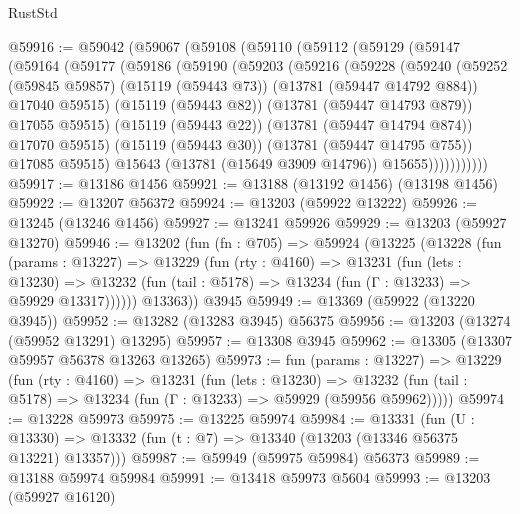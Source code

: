\begin{lexlean}{RustStd}
\begin{coremodule}
@59916 := @59042
    (@59067
      (@59108
        (@59110
          (@59112
            (@59129
              (@59147
                (@59164
                  (@59177
                    (@59186
                      (@59190
                        (@59203
                          (@59216
                            (@59228
                              (@59240
                                (@59252
                                  (@59845 @59857)
                                  (@15119 (@59443 @73))
                                  (@13781 (@59447 @14792 @884))
                                  @17040
                                  @59515)
                                (@15119 (@59443 @82))
                                (@13781 (@59447 @14793 @879))
                                @17055
                                @59515)
                              (@15119 (@59443 @22))
                              (@13781 (@59447 @14794 @874))
                              @17070
                              @59515)
                            (@15119 (@59443 @30))
                            (@13781 (@59447 @14795 @755))
                            @17085
                            @59515)
                          @15643
                          (@13781 (@15649 @3909 @14796))
                          @15655)))))))))))
@59917 := @13186 @1456
@59921 := @13188 (@13192 @1456) (@13198 @1456)
@59922 := @13207 @56372
@59924 := @13203 (@59922 @13222)
@59926 := @13245 (@13246 @1456)
@59927 := @13241 @59926
@59929 := @13203 (@59927 @13270)
@59946 := @13202
    (fun (fn : @705) =>
    @59924
      (@13225
        (@13228
          (fun (params : @13227) =>
          @13229
            (fun (rty : @4160) =>
            @13231
              (fun (lets : @13230) =>
              @13232 (fun (tail : @5178) => @13234 (fun (Γ : @13233) => @59929 @13317))))))
        @13363))
    @3945
@59949 := @13369 (@59922 (@13220 @3945))
@59952 := @13282 (@13283 @3945) @56375
@59956 := @13203 (@13274 (@59952 @13291) @13295)
@59957 := @13308 @3945
@59962 := @13305 (@13307 @59957 @56378 @13263 @13265)
@59973 := fun (params : @13227) =>
  @13229
    (fun (rty : @4160) =>
    @13231
      (fun (lets : @13230) =>
      @13232 (fun (tail : @5178) => @13234 (fun (Γ : @13233) => @59929 (@59956 @59962)))))
@59974 := @13228 @59973
@59975 := @13225 @59974
@59984 := @13331
    (fun (U : @13330) => @13332 (fun (t : @7) => @13340 (@13203 (@13346 @56375 @13221) @13357)))
@59987 := @59949 (@59975 @59984) @56373
@59989 := @13188 @59974 @59984
@59991 := @13418 @59973 @5604
@59993 := @13203 (@59927 @16120)

\end{coremodule}
\end{lexlean}
